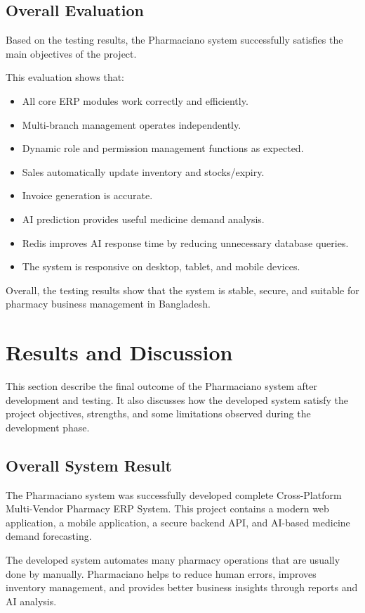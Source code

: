 \subsection{Overall Evaluation}
Based on the testing results, the Pharmaciano system successfully satisfies the main objectives of the project.

This evaluation shows that:
\begin{itemize}
\item All core ERP modules work correctly and efficiently.
\item Multi-branch management operates independently.
\item Dynamic role and permission management functions as expected.
\item Sales automatically update inventory and stocks/expiry.
\item Invoice generation is accurate.
\item AI prediction provides useful medicine demand analysis.
\item Redis improves AI response time by reducing unnecessary database queries.
\item The system is responsive on desktop, tablet, and mobile devices.
\end{itemize}

Overall, the testing results show that the system is stable, secure, and suitable for pharmacy business management in Bangladesh.

\section{Results and Discussion}
This section describe the final outcome of the Pharmaciano system after development and testing. It also discusses how the developed system satisfy the project objectives, strengths, and some limitations observed during the development phase.

\subsection{Overall System Result}
The Pharmaciano system was successfully developed complete Cross-Platform Multi-Vendor Pharmacy ERP System. This project contains a modern web application, a mobile application, a secure backend API, and AI-based medicine demand forecasting.

The developed system automates many pharmacy operations that are usually done by manually. Pharmaciano helps to reduce human errors, improves inventory management, and provides better business insights through reports and AI analysis.

